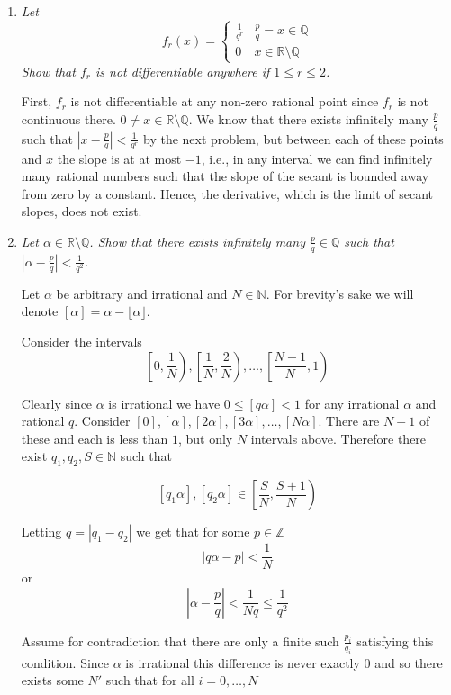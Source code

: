 \documentclass[11pt]{article}
\begin{document}
\begin{enumerate}
\item \emph{Let \[f_r(x) = \begin{cases} \frac{1}{q^r} & \frac{p}{q} = x \in \mathbb{Q} \\ 0 & x \in \mathbb{R} \setminus \mathbb{Q} \end{cases}\]  Show that $f_r$ is not differentiable anywhere if $1 \leq r \leq 2$.}

First, $f_r$ is not differentiable at any non-zero rational point since $f_r$ is not continuous there.  $0 \neq x \in \mathbb{R} \setminus \mathbb{Q}$.  We know that there exists infinitely many $\frac{p}{q}$ such that $|x - \frac{p}{q}| < \frac{1}{q^r}$ by the next problem, but between each of these points and $x$ the slope is at at most $-1$, i.e., in any interval we can find infinitely many rational numbers such that the slope of the secant is bounded away from zero by a constant.  Hence, the derivative, which is the limit of secant slopes, does not exist.

\item \emph{Let $\alpha \in \mathbb{R} \setminus \mathbb{Q}$.  Show that there exists infinitely many $\frac{p}{q} \in \mathbb{Q}$ such that $|\alpha - \frac{p}{q}| < \frac{1}{q^2}$.}


Let $\alpha$ be arbitrary and irrational and $N \in \mathbb{N}$.  For brevity's sake we will denote $[\alpha] = \alpha - \lfloor \alpha \rfloor$.

Consider the intervals
\[ \left[0,\frac{1}{N}\right), \left[\frac{1}{N}, \frac{2}{N}\right), \ldots, \left[\frac{N-1}{N}, 1\right) \]

Clearly since $\alpha$ is irrational we have $0 \leq [q\alpha] < 1$ for any irrational $\alpha$ and rational $q$.  Consider $[0], [\alpha], [2\alpha], [3\alpha], \ldots, [N\alpha]$.  There are $N+1$ of these and each is less than $1$, but only $N$ intervals above.  Therefore there exist $q_1, q_2, S \in \mathbb{N}$ such that

\[ [q_1\alpha], [q_2\alpha] \in \left[\frac{S}{N}, \frac{S+1}{N}\right)\]

Letting $q = |q_1 - q_2|$ we get that for some $p \in \mathbb{Z}$
\[ |q\alpha - p| < \frac{1}{N} \]
or
\[ |\alpha - \frac{p}{q}| < \frac{1}{Nq} \leq \frac{1}{q^2} \]

Assume for contradiction that there are only a finite such $\frac{p_i}{q_i}$ satisfying this condition.  Since $\alpha$ is irrational this difference is never exactly $0$ and so there exists some $N'$ such that for all $i = 0, \ldots, N$


\end{enumerate}
\end{document}
